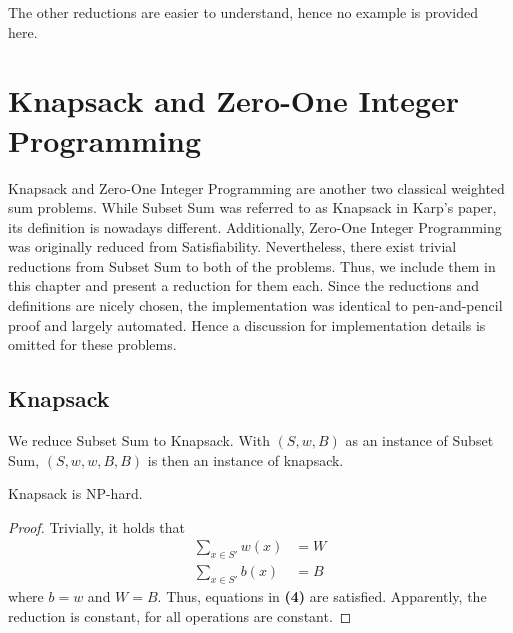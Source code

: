 The other reductions are easier to understand, hence no example is provided here.

\section{Knapsack and Zero-One Integer Programming}
Knapsack and Zero-One Integer Programming are another two classical weighted sum problems. While Subset Sum was referred 
to as Knapsack in Karp's paper, its definition is nowadays different. Additionally, Zero-One Integer Programming 
was originally reduced from Satisfiability. Nevertheless, there exist trivial reductions from Subset Sum to both of the problems. Thus, 
we include them in this chapter and present a reduction for them each. 
Since the reductions and definitions are nicely chosen, the implementation was identical to pen-and-pencil proof 
and largely automated. Hence a discussion for implementation details is omitted for these problems.

\subsection{Knapsack}
We reduce Subset Sum to Knapsack. With $(S, w, B)$ as an instance of Subset Sum, $(S, w, w, B, B)$
is then an instance of knapsack.
\begin{theorem}
    Knapsack is NP-hard.
\end{theorem}
\begin{proof}
    Trivially, it holds that 
    \begin{align*}
        \sum_{x \in S'} w(x) &= W \\ 
        \sum_{x \in S'} b(x) &= B
    \end{align*}
    where $b = w$ and $W = B$. Thus, equations in \textbf{(4)} are satisfied.
    Apparently, the reduction is constant, for all operations are constant. 
\end{proof}

